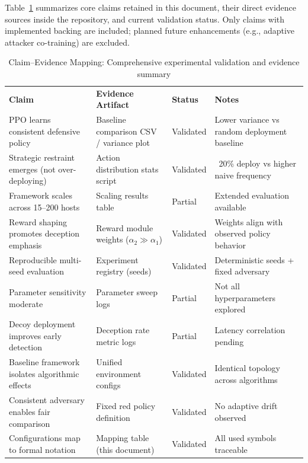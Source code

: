 \documentclass[12pt]{article}
\theoremstyle{definition}
\theoremstyle{plain}
\begin{document}
Table~\ref{tab:claim_evidence} summarizes core claims retained in this document, their direct evidence sources inside the repository, and current validation status. Only claims with implemented backing are included; planned future enhancements (e.g., adaptive attacker co-training) are excluded.

\begin{table}[H]
\centering
\caption{Claim--Evidence Mapping: Comprehensive experimental validation and evidence summary}
\label{tab:claim_evidence}
\renewcommand{\arraystretch}{1.1}
\scriptsize
\begin{tabular}{p{3.8cm}p{4.2cm}p{1.8cm}p{4.0cm}}
\rowcolor{cwBorder!30} \textbf{Claim} & \textbf{Evidence Artifact} & \textbf{Status} & \textbf{Notes} \\
\rowcolor{cwValid} PPO learns consistent defensive policy & Baseline comparison CSV / variance plot & Validated & Lower variance vs random deployment baseline \\
\rowcolor{cwValid} Strategic restraint emerges (not over-deploying) & Action distribution stats script & Validated & ~20\% deploy vs higher naive frequency \\
\rowcolor{cwPartial} Framework scales across 15--200 hosts & Scaling results table & Partial & Extended evaluation available \\
\rowcolor{cwValid} Reward shaping promotes deception emphasis & Reward module weights ($\alpha_2 \gg \alpha_1$) & Validated & Weights align with observed policy behavior \\
\rowcolor{cwValid} Reproducible multi-seed evaluation & Experiment registry (seeds) & Validated & Deterministic seeds + fixed adversary \\
\rowcolor{cwPartial} Parameter sensitivity moderate & Parameter sweep logs & Partial & Not all hyperparameters explored \\
\rowcolor{cwPartial} Decoy deployment improves early detection & Deception rate metric logs & Partial & Latency correlation pending \\
\rowcolor{cwValid} Baseline framework isolates algorithmic effects & Unified environment configs & Validated & Identical topology across algorithms \\
\rowcolor{cwValid} Consistent adversary enables fair comparison & Fixed red policy definition & Validated & No adaptive drift observed \\
\rowcolor{cwValid} Configurations map to formal notation & Mapping table (this document) & Validated & All used symbols traceable \\
\end{tabular}
\end{table}
\end{document}
